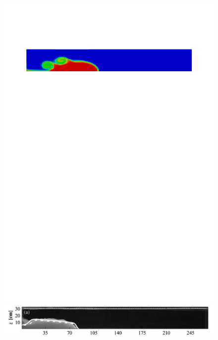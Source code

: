 \begin{figure}[ht]
  \begin{center}
    \includegraphics[scale=0.41, trim=40 648 0 50, clip]{./img/lock_adduce_4_dp_yes_PSI2_5corr.pdf} \hspace{-0.7cm}
    \includegraphics[scale=0.22, trim=88 30 180 0, clip]{./img/adduce_4.png} \vspace{-0.1cm}\\

\end{center}
\end{figure}
